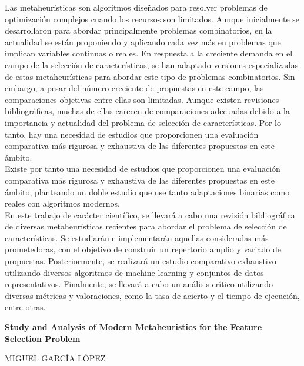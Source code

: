 Las metaheurísticas son algoritmos diseñados para resolver problemas de optimización complejos cuando los recursos son limitados. Aunque inicialmente se desarrollaron para abordar principalmente problemas combinatorios, en la actualidad se están proponiendo y aplicando cada vez más en problemas que implican variables continuas o reales. En respuesta a la creciente demanda en el campo de la selección de características, se han adaptado versiones especializadas de estas metaheurísticas para abordar este tipo de problemas combinatorios. Sin embargo, a pesar del número creciente de propuestas en este campo, las comparaciones objetivas entre ellas son limitadas. Aunque existen revisiones bibliográficas, muchas de ellas carecen de comparaciones adecuadas debido a la importancia y actualidad del problema de selección de características. Por lo tanto, hay una necesidad de estudios que proporcionen una evaluación comparativa más rigurosa y exhaustiva de las diferentes propuestas en este ámbito.\\[6pt]

Existe por tanto una necesidad de estudios que proporcionen una evaluación comparativa más rigurosa y exhaustiva de las diferentes propuestas en este ámbito, planteando un doble estudio que use tanto adaptaciones binarias como reales con algoritmos modernos.\\[6pt]

En este trabajo de carácter científico, se llevará a cabo una revisión bibliográfica de diversas metaheurísticas recientes para abordar el problema de selección de características. Se estudiarán e implementarán aquellas consideradas más prometedoras, con el objetivo de construir un repertorio amplio y variado de propuestas. Posteriormente, se realizará un estudio comparativo exhaustivo utilizando diversos algoritmos de machine learning y conjuntos de datos representativos. Finalmente, se llevará a cabo un análisis crítico utilizando diversas métricas y valoraciones, como la tasa de acierto y el tiempo de ejecución, entre otras.
\cleardoublepage


\thispagestyle{empty}


\begin{center}
       {\large\bfseries Study and Analysis of Modern Metaheuristics for the Feature Selection Problem}\\
\end{center}
\begin{center}
       MIGUEL GARCÍA LÓPEZ\\
\end{center}

